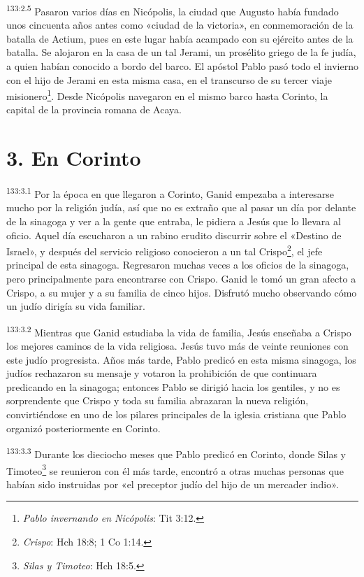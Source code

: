 \par
\textsuperscript{133:2.5} Pasaron varios días en Nicópolis, la ciudad que Augusto había fundado unos cincuenta años antes como «ciudad de la victoria», en conmemoración de la batalla de Actium, pues en este lugar había acampado con su ejército antes de la batalla. Se alojaron en la casa de un tal Jerami, un prosélito griego de la fe judía, a quien habían conocido a bordo del barco. El apóstol Pablo pasó todo el invierno con el hijo de Jerami en esta misma casa, en el transcurso de su tercer viaje misionero\footnote{\textit{Pablo invernando en Nicópolis}: Tit 3:12.}. Desde Nicópolis navegaron en el mismo barco hasta Corinto, la capital de la provincia romana de Acaya.

\section*{3. En Corinto}
\par
\textsuperscript{133:3.1} Por la época en que llegaron a Corinto, Ganid empezaba a interesarse mucho por la religión judía, así que no es extraño que al pasar un día por delante de la sinagoga y ver a la gente que entraba, le pidiera a Jesús que lo llevara al oficio. Aquel día escucharon a un rabino erudito discurrir sobre el «Destino de Israel», y después del servicio religioso conocieron a un tal Crispo\footnote{\textit{Crispo}: Hch 18:8; 1 Co 1:14.}, el jefe principal de esta sinagoga. Regresaron muchas veces a los oficios de la sinagoga, pero principalmente para encontrarse con Crispo. Ganid le tomó un gran afecto a Crispo, a su mujer y a su familia de cinco hijos. Disfrutó mucho observando cómo un judío dirigía su vida familiar.

\par
\textsuperscript{133:3.2} Mientras que Ganid estudiaba la vida de familia, Jesús enseñaba a Crispo los mejores caminos de la vida religiosa. Jesús tuvo más de veinte reuniones con este judío progresista. Años más tarde, Pablo predicó en esta misma sinagoga, los judíos rechazaron su mensaje y votaron la prohibición de que continuara predicando en la sinagoga; entonces Pablo se dirigió hacia los gentiles, y no es sorprendente que Crispo y toda su familia abrazaran la nueva religión, convirtiéndose en uno de los pilares principales de la iglesia cristiana que Pablo organizó posteriormente en Corinto.

\par
\textsuperscript{133:3.3} Durante los dieciocho meses que Pablo predicó en Corinto, donde Silas y Timoteo\footnote{\textit{Silas y Timoteo}: Hch 18:5.} se reunieron con él más tarde, encontró a otras muchas personas que habían sido instruidas por «el preceptor judío del hijo de un mercader indio».

